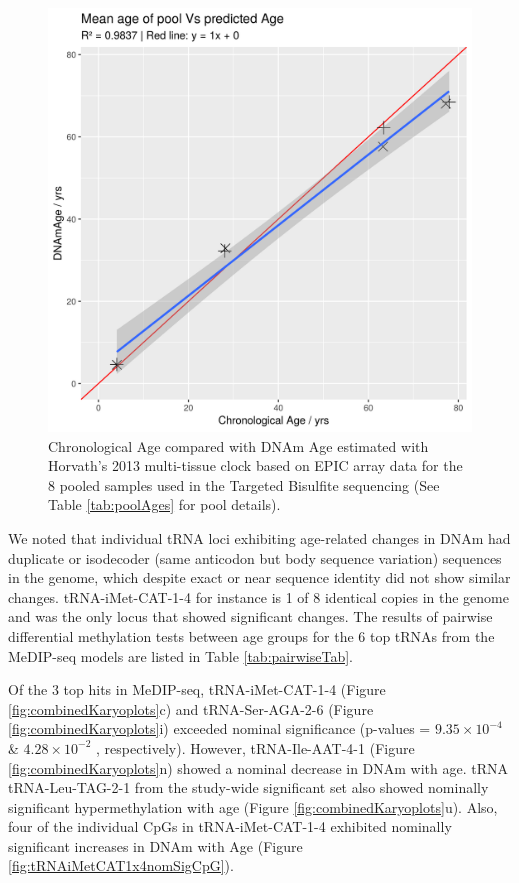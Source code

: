 \documentclass[]{book}
\begin{document}
\begin{figure}

{\centering \includegraphics[width=0.6\linewidth]{./figs/DNAmAgeVsChronAge} 

}

\caption{Chronological Age compared with DNAm Age estimated with Horvath's 2013 multi-tissue clock \citep{Horvath2013} based on EPIC array data for the 8 pooled samples used in the Targeted Bisulfite sequencing (See Table \ref{tab:poolAges} for pool details).}\label{fig:DNAmAgeVsChronAge}
\end{figure}



We noted that individual tRNA loci exhibiting age-related changes in DNAm had duplicate or isodecoder (same anticodon but body sequence variation) sequences in the genome, which despite exact or near sequence identity did not show similar changes.
tRNA-iMet-CAT-1-4 for instance is 1 of 8 identical copies in the genome and was the only locus that showed significant changes.
The results of pairwise differential methylation tests between age groups for the 6 top tRNAs from the MeDIP-seq models are listed in Table \ref{tab:pairwiseTab}.

Of the 3 top hits in MeDIP-seq, tRNA-iMet-CAT-1-4 (Figure \ref{fig:combinedKaryoplots}c) and tRNA-Ser-AGA-2-6 (Figure \ref{fig:combinedKaryoplots}i) exceeded nominal significance (p-values = \(9.35\times10^{-4}\) \& \(4.28\times10^{-2}\) , respectively).
However, tRNA-Ile-AAT-4-1 (Figure \ref{fig:combinedKaryoplots}n) showed a nominal decrease in DNAm with age.
tRNA tRNA-Leu-TAG-2-1 from the study-wide significant set also showed nominally significant hypermethylation with age (Figure \ref{fig:combinedKaryoplots}u).
Also, four of the individual CpGs in tRNA-iMet-CAT-1-4 exhibited nominally significant increases in DNAm with Age (Figure \ref{fig:tRNAiMetCAT1x4nomSigCpG}).
\end{document}
